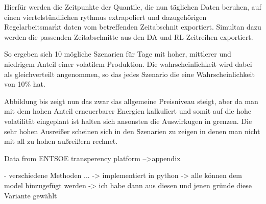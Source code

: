 Hierfür werden die Zeitpunkte der Quantile, die nun täglichen Daten beruhen, auf einen viertelstündlichen rythmus extrapoliert und
dazugehörigen Regelarbeitsmarkt daten vom betreffenden Zeitabschnit exportiert. Simultan dazu werden die passenden Zeitabschnitte aus
den DA und RL Zeitreihen exportiert.

So ergeben sich 10 mögliche Szenarien für Tage mit hoher, mittlerer und niedrigem Anteil einer volatilem Produktion. Die wahrscheinlichkeit
wird dabei als gleichverteilt angenommen, so das jedes Szenario die eine Wahrscheinlichkeit von 10\% hat.

Abbildung   bis
zeigt nun das zwar das allgemeine Preisniveau steigt, aber da man mit dem hohen Anteil erneuerbarer Energien
kalkuliert und somit auf die hohe volatilität eingeplant ist halten sich ansonsten die Auswirkugen in grenzen.
Die sehr hohen Ausreißer scheinen sich in den Szenarien zu zeigen in denen man nicht mit all zu hohen außreißern rechnet.



Data from ENTSOE transperency platform
-->appendix




- verschiedene Methoden ...
-> implementiert in python
-> alle können dem model hinzugefügt werden
-> ich habe dann aus diesen und jenen gründe diese Variante gewählt
